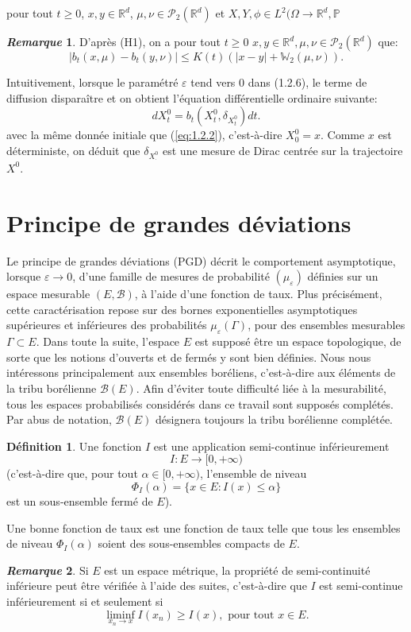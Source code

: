 \documentclass[12pt,a4paper,twoside]{book}%
\theoremstyle{definition}
\newtheorem{dfn}{Définition}[section]
\newtheorem{rem}{\textit{Remarque}}[section]
\numberwithin{equation}{section}
\begin{document}
pour tout $t \geq 0$, $x, y \in \mathbb{R}^d$, $\mu, \nu \in \mathcal{P}_2(\mathbb{R}^d)$ et $X, Y, \phi \in L^2(\Omega \to \mathbb{R}^d, \mathbb{P}$
\begin{rem}
	D'après (H1), on a pour tout $t\geq0$ $x,y\in\mathbb{R}^d,\mu,\nu\in\mathcal{P}_2(\mathbb{R}^d)$ que:
	\begin{equation}\label{eq:1.2.7}
		|b_t(x, \mu) - b_t(y, \nu)| \leq K(t)(|x - y| + \mathbb{W}_2(\mu, \nu)).
	\end{equation}
\end{rem}

Intuitivement, lorsque le paramétré $\varepsilon$ tend vers 0 dans (1.2.6), le terme de diffusion disparaître et on obtient l'équation différentielle ordinaire suivante:
\begin{equation}\label{eq:1.2.8}
	dX_t^0=b_t(X^0_t,\delta_{X_t^0})dt.
\end{equation}
avec la même donnée initiale que (\ref{eq:1.2.2}), c'est-à-dire $X_0^0=x$. Comme $x$ est déterministe, on déduit que $\delta_{X^0_\cdot}$ est une mesure de Dirac centrée sur la trajectoire $X^0$.

\section{Principe de grandes déviations}
Le principe de grandes déviations (PGD) décrit le comportement asymptotique, lorsque $\varepsilon \to 0$, d’une famille de mesures de probabilité $(\mu_{\varepsilon})$ définies sur un espace mesurable $(E,\mathcal{B})$, à l’aide d’une fonction de taux. Plus précisément, cette caractérisation repose sur des bornes exponentielles asymptotiques supérieures et inférieures des probabilités $\mu_{\varepsilon}(\Gamma)$, pour des ensembles mesurables $\Gamma \subset E$.
Dans toute la suite, l’espace $E$ est supposé être un espace topologique, de sorte que les notions d’ouverts et de fermés y sont bien définies. Nous nous intéressons principalement aux ensembles boréliens, c’est-à-dire aux éléments de la tribu borélienne $\mathcal{B}(E)$.
Afin d’éviter toute difficulté liée à la mesurabilité, tous les espaces probabilisés considérés dans ce travail sont supposés complétés. Par abus de notation, $\mathcal{B}(E)$ désignera toujours la tribu borélienne complétée.
\begin{dfn}
Une fonction $I$ est une application semi-continue inférieurement
\[
I:E\longrightarrow[0,+\infty)
\] (c'est-à-dire que, pour tout $\alpha\in[0,+\infty)$, l'ensemble de niveau
\[
\Phi_I(\alpha) = \{ x\in E:I(x)\leq\alpha\}
\] est un sous-ensemble fermé de $E$).

Une bonne fonction de taux est une fonction de taux telle que tous les ensembles de niveau $\Phi_I(\alpha)$ soient des sous-ensembles compacts de $E$.
\end{dfn}
\begin{rem}
Si $E$ est un espace métrique, la propriété de semi-continuité inférieure peut être vérifiée à l'aide des suites, c'est-à-dire que $I$ est semi-continue inférieurement si et seulement si
\[
\liminf_{x_n \to x} I(x_n) \geq I(x),\text{      pour tout }x\in E.
\]
\end{rem}
\end{document}

